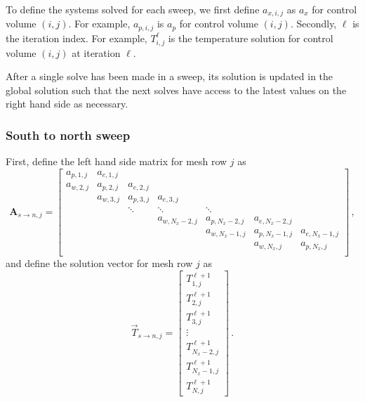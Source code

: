 \documentclass{article}
\begin{document}
To define the systems solved for each sweep, we first define $a_{x,i,j}$ as $a_x$ for control volume $(i, j)$. For example, $a_{p, i, j}$ is $a_p$ for control volume $(i, j)$. Secondly, $\ell$ is the iteration index. For example, $T_{i,j}^\ell$ is the temperature solution for control volume $(i, j)$ at iteration $\ell$.

After a single solve has been made in a sweep, its solution is updated in the global solution such that the next solves have access to the latest values on the right hand side as necessary.

\subsubsection*{South to north sweep}

\def\arraystretch{1.4}

First, define the left hand side matrix for mesh row $j$ as
\begin{equation}
	\label{eq:lhs_j}
	\mathbf{A}_{s\to n, j} =
	\begin{bmatrix}
		a_{p,1,j} & a_{e,1,j} \\
		a_{w,2,j} & a_{p,2,j} & a_{e,2,j} \\
		& a_{w,3,j} & a_{p,3,j} & a_{e,3,j} \\
		& & \ddots & \ddots & \ddots \\
		& & &  a_{w, N_x - 2, j} & a_{p, N_x - 2, j} & a_{e, N_x - 2, j} \\
		& & & & a_{w, N_x - 1, j} & a_{p, N_x - 1, j} & a_{e, N_x - 1, j} \\
		& & & & & a_{w, N_x, j} & a_{p, N_x, j} \\
	\end{bmatrix}\,,
\end{equation}
and define the solution vector for mesh row $j$ as
\begin{equation}
	\label{eq:rhs_j}
	\vec{T}_{s\to n, j} =
	\begin{bmatrix}
		T_{1, j}^{\ell + 1} \\
		T_{2, j}^{\ell + 1} \\
		T_{3, j}^{\ell + 1} \\
		\vdots \\
		T_{N_x - 2, j}^{\ell + 1} \\
		T_{N_x - 1, j}^{\ell + 1} \\
		T_{N, j}^{\ell + 1}
	\end{bmatrix}\,.
\end{equation}
\end{document}
